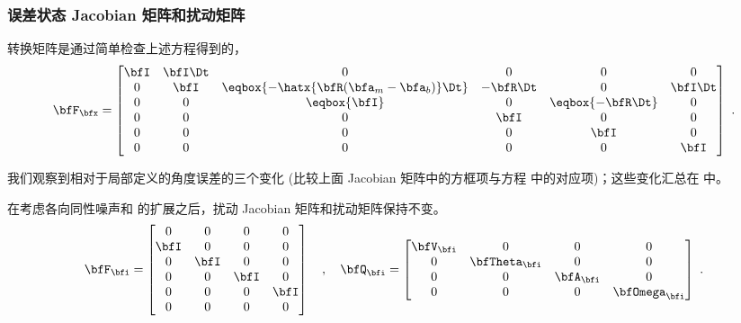 \subsubsection{误差状态 Jacobian 矩阵和扰动矩阵}

转换矩阵是通过简单检查上述方程得到的，
%
\begin{equation}
\bfF_\bfx = %
\begin{bmatrix}
\bfI & \bfI\Dt & 0                             & 0               & 0                     & 0 \\
0 & \bfI    & \eqbox{-\hatx{\bfR(\bfa_m-\bfa_b)}\Dt}     & -\bfR\Dt            & 0                     & \bfI\Dt \\
0 & 0    & \eqbox{\bfI}   & 0               & \eqbox{-\bfR\Dt}                  & 0 \\
0 & 0    & 0                             & \bfI & 0                     & 0 \\
0 & 0    & 0                             & 0               & \bfI  & 0 \\
0 & 0    & 0                             & 0               & 0                     & \bfI \\
\end{bmatrix}~.
\end{equation}

我们观察到相对于局部定义的角度误差的三个变化 (比较上面 Jacobian 矩阵中的方框项与方程  中的对应项)；这些变化汇总在 中。


在考虑各向同性噪声和 的扩展之后，扰动 Jacobian 矩阵和扰动矩阵保持不变。
%
\begin{equation}
\bfF_\bfi = %
\begin{bmatrix}
0 & 0 & 0 & 0 \\
\bfI & 0 & 0 & 0 \\
0 & \bfI & 0 & 0 \\
0 & 0 & \bfI & 0 \\
0 & 0 & 0 & \bfI \\
0 & 0 & 0 & 0 
\end{bmatrix}  
\quad,\quad
\bfQ_\bfi = \begin{bmatrix}
\bfV_\bfi & 0        & 0      & 0 \\ 
0      & \bfTheta_\bfi & 0      & 0 \\ 
0      & 0        & \bfA_\bfi & 0 \\ 
0      & 0        & 0      & \bfOmega_\bfi 
\end{bmatrix}~.
\end{equation}%
%


